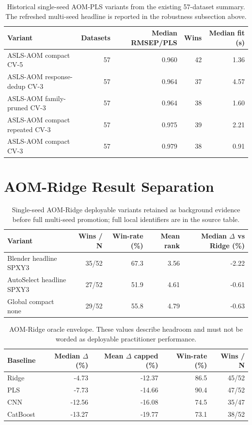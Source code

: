 \documentclass[11pt,a4paper]{article}
\begin{document}
\begin{table}[h]
\centering
\caption{Historical single-seed AOM-PLS variants from the existing
57-dataset summary.  The refreshed multi-seed headline is reported in the
robustness subsection above.}
\small
\begin{tabularx}{\linewidth}{Xrrrr}
\toprule
Variant & Datasets & Median RMSEP/PLS & Wins & Median fit (s) \\
\midrule
ASLS-AOM compact CV-5 & 57 & 0.960 & 42 & 1.36\\
ASLS-AOM response-dedup CV-3 & 57 & 0.964 & 37 & 4.57\\
ASLS-AOM family-pruned CV-3 & 57 & 0.964 & 38 & 1.60\\
ASLS-AOM compact repeated CV-3 & 57 & 0.975 & 39 & 2.21\\
ASLS-AOM compact CV-3 & 57 & 0.979 & 38 & 0.91\\
\bottomrule
\end{tabularx}
\end{table}

\section{AOM-Ridge Result Separation}

\begin{table}[h]
\centering
\caption{Single-seed AOM-Ridge deployable variants retained as background
evidence before full multi-seed promotion; full local identifiers are in the
source table.}
\small
\begin{tabularx}{\linewidth}{Xrrrr}
\toprule
Variant & Wins / N & Win-rate (\%) & Mean rank & Median $\Delta$ vs Ridge (\%) \\
\midrule
Blender headline SPXY3 & 35/52 & 67.3 & 3.56 & -2.22\\
AutoSelect headline SPXY3 & 27/52 & 51.9 & 4.61 & -0.61\\
Global compact none & 29/52 & 55.8 & 4.79 & -0.63\\
\bottomrule
\end{tabularx}
\end{table}

\begin{table}[h]
\centering
\caption{AOM-Ridge oracle envelope.  These values describe headroom and must
not be worded as deployable practitioner performance.}
\small
\begin{tabularx}{\linewidth}{Xrrrr}
\toprule
Baseline & Median $\Delta$ (\%) & Mean $\Delta$ capped (\%) & Win-rate (\%) & Wins / N\\
\midrule
Ridge & -4.73 & -12.37 & 86.5 & 45/52\\
PLS & -7.73 & -14.66 & 90.4 & 47/52\\
CNN & -12.56 & -16.08 & 74.5 & 35/47\\
CatBoost & -13.27 & -19.77 & 73.1 & 38/52\\
\bottomrule
\end{tabularx}
\end{table}
\end{document}
